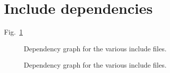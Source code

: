 %
%
% 
% 
% 
% 
%

\section{Include dependencies}

\begin{description}
\item[Fig.~\ref{fig:Includes}] Dependency graph for the various include
files.
\end{description}

\begin{figure}[h]\begin{center}
\caption{Dependency graph for the various include files.}
\label{fig:Includes}
\end{center}\end{figure}
